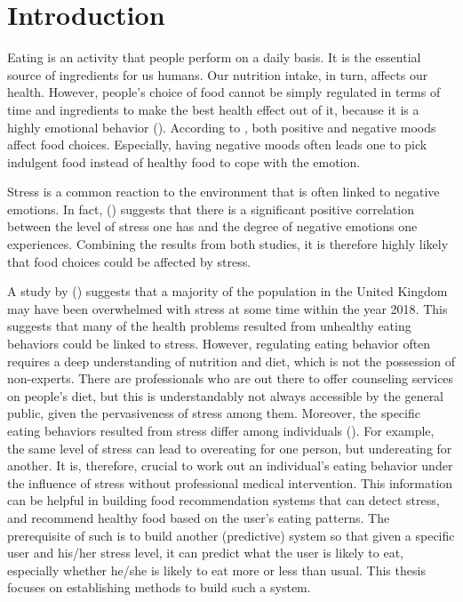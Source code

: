 
\chapter{Introduction}\label{chapter:introduction}
Eating is an activity that people perform on a daily basis. It is the essential source of ingredients for us humans. Our nutrition intake, in turn, affects our health. However, people’s choice of food cannot be simply regulated in terms of time and ingredients to make the best health effect out of it, because it is a highly emotional behavior (\cite{4_mood_eat, 14_comfort_food}). According to \citeauthor{4_mood_eat}, both positive and negative moods affect food choices. Especially, having negative moods often leads one to pick indulgent food instead of healthy food to cope with the emotion.

Stress is a common reaction to the environment that is often linked to negative emotions. In fact, \citeauthor{1_stress_emotion} (\citeyear{1_stress_emotion}) suggests that there is a significant positive correlation between the level of stress one has and the degree of negative emotions one experiences. Combining the results from both studies, it is therefore highly likely that food choices could be affected by stress.

A study by \citeauthor{2_many_stress} (\citeyear{2_many_stress}) suggests that a majority of the population in the United Kingdom may have been overwhelmed with stress at some time within the year 2018. This suggests that many of the health problems resulted from unhealthy eating behaviors could be linked to stress. However, regulating eating behavior often requires a deep understanding of nutrition and diet, which is not the possession of non-experts. There are professionals who are out there to offer counseling services on people’s diet, but this is understandably not always accessible by the general public, given the pervasiveness of stress among them. Moreover, the specific eating behaviors resulted from stress differ among individuals (\cite{5_stress_eating}). For example, the same level of stress can lead to overeating for one person, but undereating for another. It is, therefore, crucial to work out an individual’s eating behavior under the influence of stress without professional medical intervention. This information can be helpful in building food recommendation systems that can detect stress, and recommend healthy food based on the user’s eating patterns. The prerequisite of such is to build another (predictive) system so that given a specific user and his/her stress level, it can predict what the user is likely to eat, especially whether he/she is likely to eat more or less than usual. This thesis focuses on establishing methods to build such a system. \bigskip

